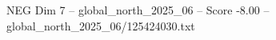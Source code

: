 \begin{textsample}{NEG Dim 7 – global\_north\_2025\_06 – Score -8.00 – global\_north\_2025\_06/125424030.txt}
\end{textsample}
